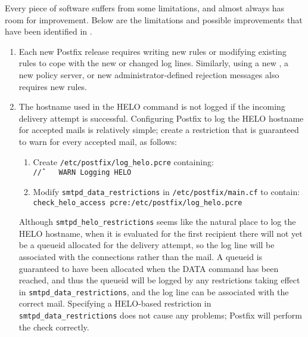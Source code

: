 \label{limitations and improvements in implementation}

Every piece of software suffers from some limitations, and almost always
has room for improvement.  Below are the limitations and possible
improvements that have been identified in \parsername{}.

\label{logging helo}

\begin{enumerate}

    \item Each new Postfix release requires writing new rules or modifying
        existing rules to cope with the new or changed log lines.
        Similarly, using a new , a new policy server, or new
        administrator-defined rejection messages also requires new rules.

    \item The hostname used in the HELO command is not logged if the
        incoming delivery attempt is successful.  Configuring Postfix to
        log the HELO hostname for accepted mails is relatively simple;
        create a restriction that is guaranteed to warn for every accepted
        mail, as follows:

        \begin{enumerate}

            \item Create \texttt{/etc/postfix/log\_helo.pcre}
                containing:\newline{}
                \tab{}\texttt{/\^/~~~~WARN~Logging~HELO}

            \item Modify \texttt{smtpd\_data\_restrictions} in
                \texttt{/etc/postfix/main.cf} to contain:\newline{}
                \tab{}\texttt{check\_helo\_access~pcre:/etc/postfix/log\_helo.pcre}

        \end{enumerate}

        Although \texttt{smtpd\_helo\_restrictions} seems like the natural
        place to log the HELO hostname, when it is evaluated for the first
        recipient there will not yet be a queueid allocated for the
        delivery attempt, so the log line will be associated with the
        connections rather than the mail.  A queueid is guaranteed to have
        been allocated when the DATA command has been reached, and thus the
        queueid will be logged by any restrictions taking effect in
        \texttt{smtpd\_data\_restrictions}, and the log line can be
        associated with the correct mail.  Specifying a HELO-based
        restriction in \texttt{smtpd\_data\_restrictions} does not cause
        any problems; Postfix will perform the check correctly.


\end{enumerate}

